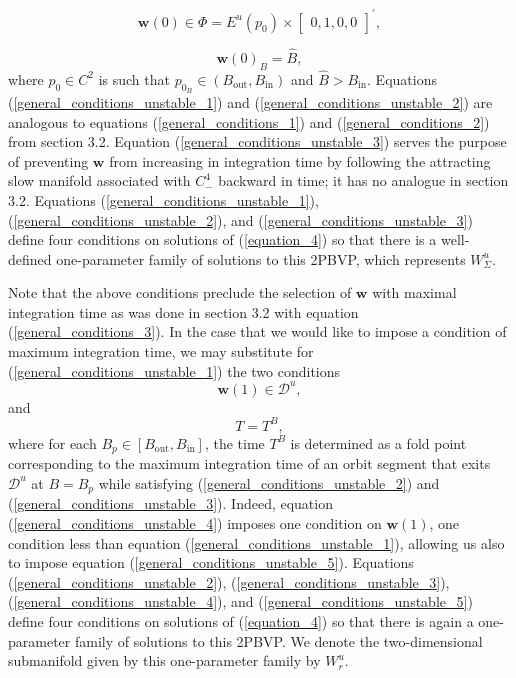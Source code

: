 \documentclass{ws-ijbc}
\begin{document}
\begin{equation}
	\mathbf{w}(0) \in \Phi = E^u(p_0) \times \begin{bmatrix} 0, 1, 0, 0 \end{bmatrix}^{\prime},
\label{general_conditions_unstable_2}
\end{equation}

\begin{equation}
	\mathbf{w}(0)_B = \widehat{B},
	\label{general_conditions_unstable_3}
\end{equation}
where $p_0 \in C^2$ is such that $p_{0_B} \in (B_{\text{out}}, B_{\text{in}})$ and $\widehat{B}>B_{\text{in}}$.  Equations (\ref{general_conditions_unstable_1}) and (\ref{general_conditions_unstable_2}) are analogous to equations (\ref{general_conditions_1}) and (\ref{general_conditions_2}) from section 3.2.  Equation (\ref{general_conditions_unstable_3}) serves the purpose of preventing $\mathbf{w}$ from increasing in integration time by following the attracting slow manifold associated with $C^4_-$ backward in time; it has no analogue in section 3.2.    Equations (\ref{general_conditions_unstable_1}), (\ref{general_conditions_unstable_2}), and (\ref{general_conditions_unstable_3}) define four conditions on solutions of (\ref{equation_4}) so that there is a well-defined one-parameter family of solutions to this 2PBVP, which represents $W^u_\Sigma$.

Note that the above conditions preclude the selection of $\mathbf{w}$ with maximal integration time as was done in section 3.2 with equation (\ref{general_conditions_3}).  In the case that we would like to impose a condition of maximum integration time, we may substitute for (\ref{general_conditions_unstable_1}) the two conditions
\begin{equation}
	\mathbf{w}(1) \in \mathscr{D}^u,
	\label{general_conditions_unstable_4}
\end{equation}
and
\begin{equation}
	T = T^B,
	\label{general_conditions_unstable_5}
\end{equation}
where for each $B_p \in [B_{\text{out}}, B_{\text{in}}]$, the time $T^B$ is determined as a fold point corresponding to the maximum integration time of an orbit segment that exits $\mathscr{D}^u$ at $B = B_p$ while satisfying (\ref{general_conditions_unstable_2}) and (\ref{general_conditions_unstable_3}).  Indeed, equation (\ref{general_conditions_unstable_4}) imposes one condition on $\mathbf{w}(1)$, one condition less than equation (\ref{general_conditions_unstable_1}), allowing us also to impose equation (\ref{general_conditions_unstable_5}).  Equations (\ref{general_conditions_unstable_2}), (\ref{general_conditions_unstable_3}), (\ref{general_conditions_unstable_4}), and (\ref{general_conditions_unstable_5}) define four conditions on solutions of (\ref{equation_4}) so that there is again a one-parameter family of solutions to this 2PBVP.  We denote the two-dimensional submanifold given by this one-parameter family by $W^u_r$.
\end{document}
